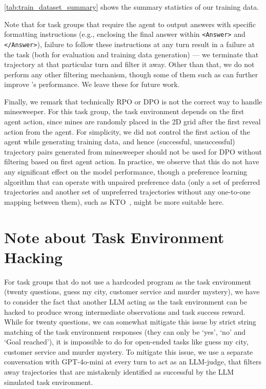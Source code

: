 \cref{tab:train_dataset_summary} shows the summary statistics of our training data.


Note that for task groups that require the agent to output answers with specific formatting instructions (e.g., enclosing the final answer within \texttt{<Answer>} and \texttt{</Answer>}), failure to follow these instructions at any turn result in a failure at the task (both for evaluation and training data generation) --- we terminate that trajectory at that particular turn and filter it away. Other than that, we do not perform any other filtering mechanism, though some of them such as \citet{razin2024unintentionalunalignmentlikelihooddisplacement} can further improve \ours{}'s performance. We leave these for future work.

Finally, we remark that technically RPO or DPO is not the correct way to handle minesweeper. For this task group, the task environment depends on the first agent action, since mines are randomly placed in the 2D grid after the first reveal action from the agent. For simplicity, we did not control the first action of the agent while generating training data, and hence (successful, unsuccessful) trajectory pairs generated from minesweeper should not be used for DPO without filtering based on first agent action. In practice, we observe that this do not have any significant effect on the model performance, though a preference learning algorithm that can operate with unpaired preference data (only a set of preferred trajectories and another set of unpreferred trajectories without any one-to-one mapping between them), such as KTO~\citep{ethayarajh2024ktomodelalignmentprospect}, might be more suitable here.



\newpage


\section{Note about Task Environment Hacking} \label{section:environment_hacking}

For task groups that do not use a hardcoded program as the task environment (twenty questions, guess my city, customer service and murder mystery), we have to consider the fact that another LLM acting as the task environment can be hacked to produce wrong intermediate observations and task success reward. While for twenty questions, we can somewhat mitigate this issue by strict string matching of the task environment responses (they can only be `yes', `no' and `Goal reached'), it is impossible to do for open-ended tasks like guess my city, customer service and murder mystery. To mitigate this issue, we use a separate conversation with GPT-4o-mini at every turn to act as an LLM-judge, that filters away trajectories that are mistakenly identified as successful by the LLM simulated task environment. 

